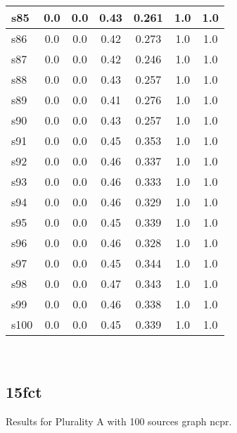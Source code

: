 \documentclass{article}
\begin{document}
\begin{tabular}{|l|c|c|c|c|c|c|}
\hline
s85 &0.0 & 0.0 & 0.43 & 0.261 & 1.0 & 1.0\\
\hline
s86 &0.0 & 0.0 & 0.42 & 0.273 & 1.0 & 1.0\\
\hline
s87 &0.0 & 0.0 & 0.42 & 0.246 & 1.0 & 1.0\\
\hline
s88 &0.0 & 0.0 & 0.43 & 0.257 & 1.0 & 1.0\\
\hline
s89 &0.0 & 0.0 & 0.41 & 0.276 & 1.0 & 1.0\\
\hline
s90 &0.0 & 0.0 & 0.43 & 0.257 & 1.0 & 1.0\\
\hline
s91 &0.0 & 0.0 & 0.45 & 0.353 & 1.0 & 1.0\\
\hline
s92 &0.0 & 0.0 & 0.46 & 0.337 & 1.0 & 1.0\\
\hline
s93 &0.0 & 0.0 & 0.46 & 0.333 & 1.0 & 1.0\\
\hline
s94 &0.0 & 0.0 & 0.46 & 0.329 & 1.0 & 1.0\\
\hline
s95 &0.0 & 0.0 & 0.45 & 0.339 & 1.0 & 1.0\\
\hline
s96 &0.0 & 0.0 & 0.46 & 0.328 & 1.0 & 1.0\\
\hline
s97 &0.0 & 0.0 & 0.45 & 0.344 & 1.0 & 1.0\\
\hline
s98 &0.0 & 0.0 & 0.47 & 0.343 & 1.0 & 1.0\\
\hline
s99 &0.0 & 0.0 & 0.46 & 0.338 & 1.0 & 1.0\\
\hline
s100 &0.0 & 0.0 & 0.45 & 0.339 & 1.0 & 1.0\\
\hline
\end{tabular}\\

\newpage

\subsection{15fct}

\noindent Results for Plurality A with 100 sources graph ncpr.
\end{document}
